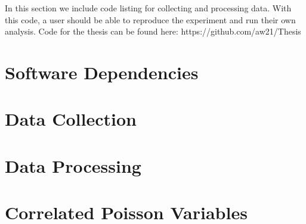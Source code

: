 In this section we include code listing for collecting and processing data. With this code, a user should be able to reproduce the experiment and run their own analysis. Code for the thesis can be found here: https://github.com/aw21/Thesis

\section{Software Dependencies}


\section{Data Collection}
\label{data-collection-code}

\section{Data Processing}
\label{data-processing-code}

\section{Correlated Poisson Variables}
\label{correlated-poisson}
